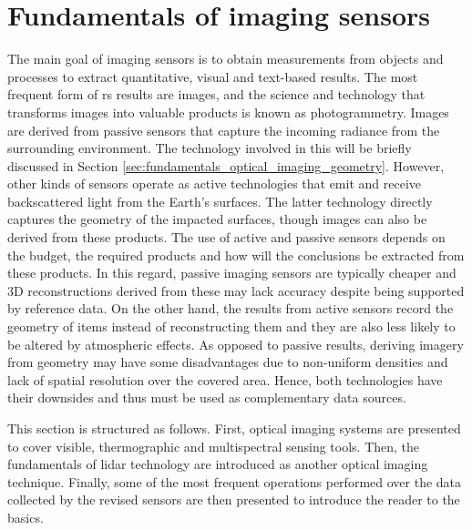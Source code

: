 \setchapterpreamble[u]{\margintoc}
\chapter{Fundamentals of imaging sensors}
\label{sec:fundamentals_rs}


The main goal of imaging sensors is to obtain measurements from objects and processes to extract quantitative, visual and text-based results. The most frequent form of \acrshort{rs} results are images, and the science and technology that transforms images into valuable products is known as photogrammetry. Images are derived from passive sensors that capture the incoming radiance from the surrounding environment. The technology involved in this will be briefly discussed in Section \ref{sec:fundamentals_optical_imaging_geometry}. However, other kinds of sensors operate as active technologies that emit and receive backscattered light from the Earth's surfaces. The latter technology directly captures the geometry of the impacted surfaces, though images can also be derived from these products. The use of active and passive sensors depends on the budget, the required products and how will the conclusions be extracted from these products. In this regard, passive imaging sensors are typically cheaper and 3D reconstructions derived from these may lack accuracy despite being supported by reference data. On the other hand, the results from active sensors record the geometry of items instead of reconstructing them and they are also less likely to be altered by atmospheric effects. As opposed to passive results, deriving imagery from geometry may have some disadvantages due to non-uniform densities and lack of spatial resolution over the covered area. Hence, both technologies have their downsides and thus must be used as complementary data sources.

This section is structured as follows. First, optical imaging systems are presented to cover visible, thermographic and multispectral sensing tools. Then, the fundamentals of \acrshort{lidar} technology are introduced as another optical imaging technique. Finally, some of the most frequent operations performed over the data collected by the revised sensors are then presented to introduce the reader to the basics. 


